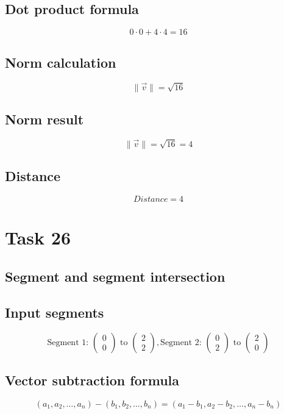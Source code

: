 \documentclass{article}
\begin{document}
\subsection*{ \vspace{1em} Dot product formula}
\[
0 \cdot 0 + 4 \cdot 4 = 16
\]
\subsection*{ \vspace{1em} Norm calculation}
\[
\|\vec{v}\| = \sqrt{16}
\]
\subsection*{ \vspace{1em} Norm result}
\[
\|\vec{v}\| = \sqrt{16} = 4
\]
\subsection*{ \vspace{1em} Distance}
\[
Distance = 4
\]
\bigskip

\hrulefill
\bigskip

\section*{Task 26}

\subsection*{Segment and segment intersection}
\subsection*{ \vspace{1em} Input segments}
\[
\text{Segment 1: } \begin{pmatrix}0 \\ 0 \end{pmatrix} \text{ to } \begin{pmatrix}2 \\ 2\end{pmatrix}, 
        \text{Segment 2: } \begin{pmatrix}0 \\ 2\end{pmatrix} \text{ to } \begin{pmatrix}2 \\ 0\end{pmatrix}
\]
\subsection*{ \vspace{1em} Vector subtraction formula}
\[
(a_1, a_2, \dots, a_n) - (b_1, b_2, \dots, b_n) = (a_1 - b_1, a_2 - b_2, \dots, a_n - b_n)
\]
\end{document}
